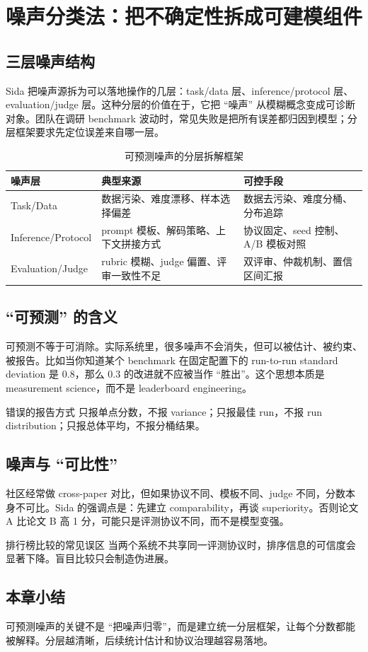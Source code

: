\section{噪声分类法：把不确定性拆成可建模组件}

\subsection{三层噪声结构}
Sida 把噪声源拆为可以落地操作的几层：task/data 层、inference/protocol 层、evaluation/judge 层。这种分层的价值在于，它把 ``噪声'' 从模糊概念变成可诊断对象。团队在调研 benchmark 波动时，常见失败是把所有误差都归因到模型；分层框架要求先定位误差来自哪一层。

\begin{table}[H]
\centering
\begin{tabular}{p{3.2cm}p{4.2cm}p{4.2cm}}
\toprule
\textbf{噪声层} & \textbf{典型来源} & \textbf{可控手段} \\
\midrule
Task/Data & 数据污染、难度漂移、样本选择偏差 & 数据去污染、难度分桶、分布追踪 \\
Inference/Protocol & prompt 模板、解码策略、上下文拼接方式 & 协议固定、seed 控制、A/B 模板对照 \\
Evaluation/Judge & rubric 模糊、judge 偏置、评审一致性不足 & 双评审、仲裁机制、置信区间汇报 \\
\bottomrule
\end{tabular}
\caption{可预测噪声的分层拆解框架}
\end{table}

\subsection{``可预测'' 的含义}
可预测不等于可消除。实际系统里，很多噪声不会消失，但可以被估计、被约束、被报告。比如当你知道某个 benchmark 在固定配置下的 run-to-run standard deviation 是 $0.8$，那么 $0.3$ 的改进就不应被当作 ``胜出''。这个思想本质是 measurement science，而不是 leaderboard engineering。

\begin{importantbox}{错误的报告方式}
只报单点分数，不报 variance；只报最佳 run，不报 run distribution；只报总体平均，不报分桶结果。
\end{importantbox}

\subsection{噪声与 ``可比性''}
社区经常做 cross-paper 对比，但如果协议不同、模板不同、judge 不同，分数本身不可比。Sida 的强调点是：先建立 comparability，再谈 superiority。否则论文 A 比论文 B 高 1 分，可能只是评测协议不同，而不是模型变强。

\begin{warningbox}{排行榜比较的常见误区}
当两个系统不共享同一评测协议时，排序信息的可信度会显著下降。盲目比较只会制造伪进展。
\end{warningbox}

\subsection{本章小结}
可预测噪声的关键不是 ``把噪声归零''，而是建立统一分层框架，让每个分数都能被解释。分层越清晰，后续统计估计和协议治理越容易落地。

